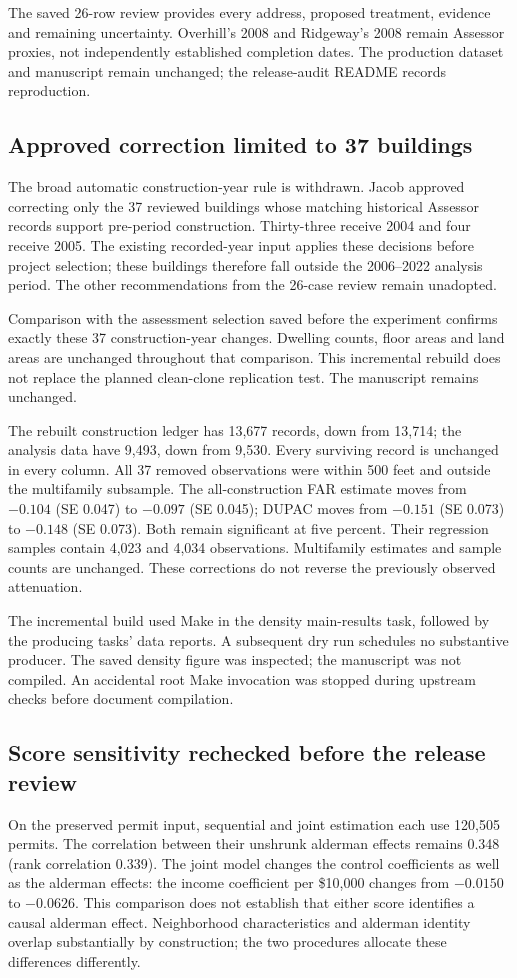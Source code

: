 The saved 26-row review provides every address, proposed treatment, evidence and
remaining uncertainty. Overhill's 2008 and Ridgeway's 2008 remain Assessor proxies,
not independently established completion dates. The production dataset and
manuscript remain unchanged; the release-audit README records reproduction.

\subsection*{Approved correction limited to 37 buildings}
The broad automatic construction-year rule is withdrawn. Jacob approved correcting
only the 37 reviewed buildings whose matching historical Assessor records support
pre-period construction. Thirty-three receive 2004 and four receive 2005. The
existing recorded-year input applies these decisions before project selection;
these buildings therefore fall outside the 2006--2022 analysis period. The other
recommendations from the 26-case review remain unadopted.

Comparison with the assessment selection saved before the experiment confirms
exactly these 37 construction-year changes. Dwelling counts, floor areas and land
areas are unchanged throughout that comparison. This incremental rebuild does
not replace the planned clean-clone replication test. The manuscript remains
unchanged.


The rebuilt construction ledger has 13,677 records, down from 13,714; the analysis
data have 9,493, down from 9,530. Every surviving record is unchanged in every
column. All 37 removed observations were within 500 feet and outside the
multifamily subsample. The all-construction FAR estimate moves from $-0.104$
(SE 0.047) to $-0.097$ (SE 0.045); DUPAC moves from $-0.151$ (SE 0.073) to
$-0.148$ (SE 0.073). Both remain significant at five percent. Their regression
samples contain 4,023 and 4,034 observations. Multifamily estimates and sample
counts are unchanged. These corrections do not reverse the previously observed
attenuation.

The incremental build used Make in the density main-results task, followed by
the producing tasks' data reports. A subsequent dry run schedules no substantive
producer. The saved density figure was inspected; the manuscript was not compiled. An accidental root Make invocation was stopped
during upstream checks before document compilation.

\subsection*{Score sensitivity rechecked before the release review}
On the preserved permit input, sequential and joint estimation each use 120,505
permits. The correlation between their unshrunk alderman effects remains 0.348
(rank correlation 0.339). The joint model changes the control coefficients as
well as the alderman effects: the income coefficient per \$10,000 changes from
$-0.0150$ to $-0.0626$. This comparison does not establish that either score
identifies a causal alderman effect. Neighborhood characteristics and alderman
identity overlap substantially by construction; the two procedures allocate
these differences differently.

